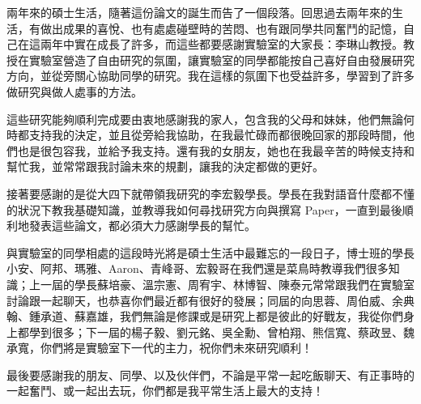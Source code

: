 \NTUtitlepage  %

\newpage
\setcounter{page}{1}

\NTUoralpage  %

\mydoublespacing
\begin{acknowledgement} %
兩年來的碩士生活，隨著這份論文的誕生而告了一個段落。回思過去兩年來的生活，有做出成果的喜悅、也有處處碰壁時的苦悶、也有跟同學共同奮鬥的記憶，自己在這兩年中實在成長了許多，而這些都要感謝實驗室的大家長：李琳山教授。教授在實驗室營造了自由研究的氛圍，讓實驗室的同學都能按自己喜好自由發展研究方向，並從旁關心協助同學的研究。我在這樣的氛圍下也受益許多，學習到了許多做研究與做人處事的方法。

這些研究能夠順利完成要由衷地感謝我的家人，包含我的父母和妹妹，他們無論何時都支持我的決定，並且從旁給我協助，在我最忙碌而都很晚回家的那段時間，他們也是很包容我，並給予我支持。還有我的女朋友，她也在我最辛苦的時候支持和幫忙我，並常常跟我討論未來的規劃，讓我的決定都做的更好。

接著要感謝的是從大四下就帶領我研究的李宏毅學長。學長在我對語音什麼都不懂的狀況下教我基礎知識，並教導我如何尋找研究方向與撰寫 Paper，一直到最後順利地發表這些論文，都必須大力感謝學長的幫忙。

與實驗室的同學相處的這段時光將是碩士生活中最難忘的一段日子，博士班的學長小安、阿邦、瑪雅、Aaron、青峰哥、宏毅哥在我們還是菜鳥時教導我們很多知識；上一屆的學長蘇培豪、溫宗憲、周宥宇、林博智、陳泰元常常跟我們在實驗室討論跟一起聊天，也恭喜你們最近都有很好的發展；同屆的向思蓉、周伯威、余典翰、鍾承道、蘇嘉雄，我們無論是修課或是研究上都是彼此的好戰友，我從你們身上都學到很多；下一屆的楊子毅、劉元銘、吳全勳、曾柏翔、熊信寬、蔡政昱、魏承寬，你們將是實驗室下一代的主力，祝你們未來研究順利！

最後要感謝我的朋友、同學、以及伙伴們，不論是平常一起吃飯聊天、有正事時的一起奮鬥、或一起出去玩，你們都是我平常生活上最大的支持！

\end{acknowledgement}

